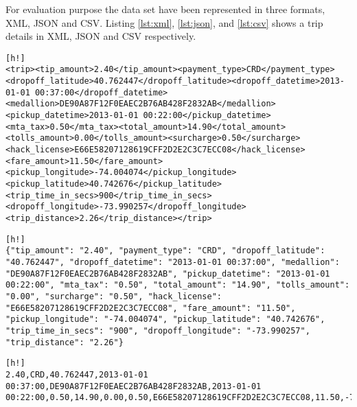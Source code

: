 For evaluation purpose the data set have been represented in three formats, XML, JSON and CSV. Listing \ref{lst:xml}, \ref{lst:json}, and \ref{lst:csv} shows a trip details in XML, JSON and CSV respectively. 

\bigskip
\begin{lstlisting}[style=XmlInputStyle,caption=Trip details in XML, label={lst:xml}][h!]
<trip><tip_amount>2.40</tip_amount><payment_type>CRD</payment_type><dropoff_latitude>40.762447</dropoff_latitude><dropoff_datetime>2013-01-01 00:37:00</dropoff_datetime><medallion>DE90A87F12F0EAEC2B76AB428F2832AB</medallion><pickup_datetime>2013-01-01 00:22:00</pickup_datetime><mta_tax>0.50</mta_tax><total_amount>14.90</total_amount><tolls_amount>0.00</tolls_amount><surcharge>0.50</surcharge><hack_license>E66E58207128619CFF2D2E2C3C7ECC08</hack_license><fare_amount>11.50</fare_amount><pickup_longitude>-74.004074</pickup_longitude><pickup_latitude>40.742676</pickup_latitude><trip_time_in_secs>900</trip_time_in_secs><dropoff_longitude>-73.990257</dropoff_longitude><trip_distance>2.26</trip_distance></trip>
\end{lstlisting} 

\bigskip
\begin{lstlisting}[style=JsonInputStyle,caption=Trip details in JSON, label={lst:json}][h!]
{"tip_amount": "2.40", "payment_type": "CRD", "dropoff_latitude": "40.762447", "dropoff_datetime": "2013-01-01 00:37:00", "medallion": "DE90A87F12F0EAEC2B76AB428F2832AB", "pickup_datetime": "2013-01-01 00:22:00", "mta_tax": "0.50", "total_amount": "14.90", "tolls_amount": "0.00", "surcharge": "0.50", "hack_license": "E66E58207128619CFF2D2E2C3C7ECC08", "fare_amount": "11.50", "pickup_longitude": "-74.004074", "pickup_latitude": "40.742676", "trip_time_in_secs": "900", "dropoff_longitude": "-73.990257", "trip_distance": "2.26"}
\end{lstlisting} 

\bigskip
\begin{lstlisting}[style=XmlInputStyle,caption=Trip details in CSV, label={lst:csv}][h!]
2.40,CRD,40.762447,2013-01-01 00:37:00,DE90A87F12F0EAEC2B76AB428F2832AB,2013-01-01 00:22:00,0.50,14.90,0.00,0.50,E66E58207128619CFF2D2E2C3C7ECC08,11.50,-74.004074,40.742676,900,-73.990257,2.26
\end{lstlisting} 

